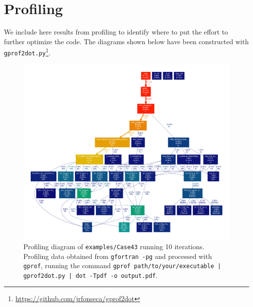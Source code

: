 \chapter{Profiling}\label{sec:profiling}

We include here results from profiling to identify where to put the effort to further optimize the code. The diagrams shown below have been constructed with {\tt gprof2dot.py}\footnote{\url{https://github.com/jrfonseca/gprof2dot}}.

\begin{figure}[H]
  \centering
  \includegraphics[clip,width=\textwidth]{figs/profiling.pdf}
  \caption{Profiling diagram of {\tt examples/Case43} running 10 iterations. Profiling data obtained from {\tt gfortran -pg} and processed with {\tt gprof}, running the command {\tt gprof path/to/your/executable | gprof2dot.py | dot -Tpdf -o output.pdf}.}
\end{figure}

